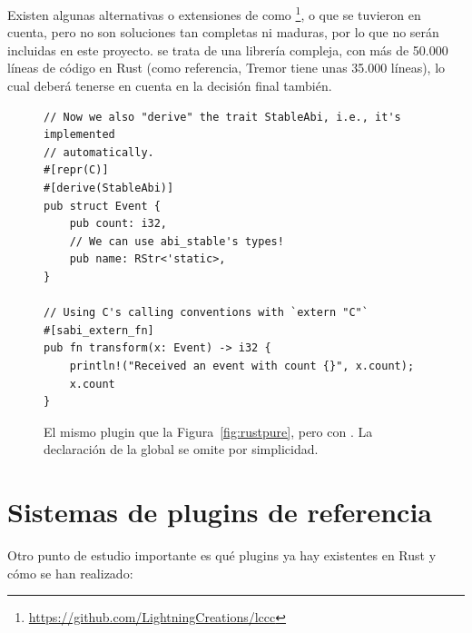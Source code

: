 Existen algunas alternativas o extensiones de  como
\footnote{\url{https://github.com/LightningCreations/lccc}},
 o  que se tuvieron en cuenta, pero no son
soluciones tan completas ni maduras, por lo que no serán incluidas en este
proyecto.  se trata de una librería compleja, con más de 50.000
líneas de código en Rust (como referencia, Tremor tiene unas 35.000 líneas), lo
cual deberá tenerse en cuenta en la decisión final también.

\begin{figure}
    \centering
    \begin{verbatim}
// Now we also "derive" the trait StableAbi, i.e., it's implemented
// automatically.
#[repr(C)]
#[derive(StableAbi)]
pub struct Event {
    pub count: i32,
    // We can use abi_stable's types!
    pub name: RStr<'static>,
}

// Using C's calling conventions with `extern "C"`
#[sabi_extern_fn]
pub fn transform(x: Event) -> i32 {
    println!("Received an event with count {}", x.count);
    x.count
}
    \end{verbatim}

    \caption{El mismo plugin que la Figura~\ref{fig:rustpure}, pero con
        . La declaración de la global  se omite por
        simplicidad.}%
    \label{fig:rustabi_stable}
\end{figure}

\section{Sistemas de plugins de referencia}

Otro punto de estudio importante es qué plugins ya hay existentes en Rust y cómo
se han realizado:

